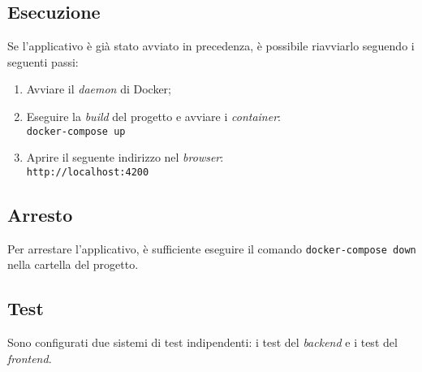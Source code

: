 \subsection{Esecuzione}
Se l'applicativo è già stato avviato in precedenza, è possibile riavviarlo
seguendo i seguenti passi:
\begin{enumerate}
	\item Avviare il \textit{daemon} di Docker;
	\item Eseguire la \textit{build} del progetto e avviare i \textit{container}: \\
		\texttt{docker-compose up}
	\item Aprire il seguente indirizzo nel \textit{browser}: \\
		\texttt{http://localhost:4200}
\end{enumerate}


\subsection{Arresto}
Per arrestare l'applicativo, è sufficiente eseguire il comando
\texttt{docker-compose down} nella cartella del progetto.


\subsection{Test}
Sono configurati due sistemi di test indipendenti: i test del \textit{backend} e
i test del \textit{frontend}.

